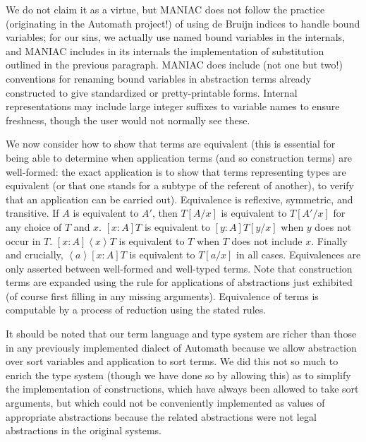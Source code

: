 \documentclass[12pt]{article}
\begin{document}
We do not claim it as a virtue, but MANIAC does not follow the practice (originating in the Automath project!) of using de Bruijn indices to handle bound variables;  for our sins, we actually use named bound variables in the internals, and MANIAC includes in its internals the implementation of substitution outlined in the previous paragraph.  MANIAC does include (not one but two!) conventions for renaming bound variables in abstraction terms already constructed to give standardized or pretty-printable forms.  Internal representations may include
large integer suffixes to variable names to ensure freshness, though the user would not normally see these.

We now consider how to show that terms are equivalent (this is essential for being able to determine when application terms (and so construction terms) are well-formed:  the exact application is to show that terms representing types are equivalent (or that one stands for a subtype of the referent of another), to verify that an application can be carried out).  Equivalence is reflexive, symmetric, and transitive.   If $A$ is equivalent to $A'$, then $T[A/x]$ is equivalent to $T[A'/x]$ for any choice of $T$ and $x$.  $[x:A]T$ is equivalent to $[y:A]T[y/x]$ when $y$ does not occur in $T$.  $[x:A]\left<x\right>T$ is equivalent to $T$ when $T$ does not include $x$.  Finally and crucially, $\left<a\right>[x:A]T$ is equivalent to $T[a/x]$ in all cases.  Equivalences are only asserted between well-formed and well-typed terms.  Note that construction terms are expanded using the rule for applications of abstractions just exhibited (of course first filling in any missing arguments).  Equivalence of terms is computable by a process of reduction using the stated rules.

It should be noted that our term language and type system are richer than those in any previously implemented dialect of Automath because we allow abstraction over sort variables 
and application to sort terms.  We did this not so much to enrich the type system (though we have done so by allowing this) as to simplify the implementation of constructions, which have always been allowed to take sort arguments, but which could not be conveniently implemented as values of appropriate abstractions because the related abstractions were not legal abstractions in the original systems.
\end{document}
